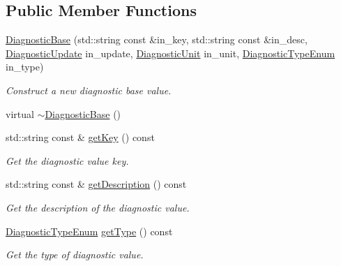 \subsection*{Public Member Functions}
\begin{DoxyCompactItemize}
\item 
\hyperlink{structvt_1_1runtime_1_1component_1_1detail_1_1_diagnostic_base_ae96f19eb79a538b5f21d6f4a6a2a5e0a}{Diagnostic\+Base} (std\+::string const \&in\+\_\+key, std\+::string const \&in\+\_\+desc, \hyperlink{namespacevt_1_1runtime_1_1component_a896637e6e183a909a17bfd8d3943c206}{Diagnostic\+Update} in\+\_\+update, \hyperlink{namespacevt_1_1runtime_1_1component_a99ec18b08862c712176126bb7d0e307a}{Diagnostic\+Unit} in\+\_\+unit, \hyperlink{namespacevt_1_1runtime_1_1component_af0bb99d9a054682217874bdc735ecac0}{Diagnostic\+Type\+Enum} in\+\_\+type)
\begin{DoxyCompactList}\small\item\em Construct a new diagnostic base value. \end{DoxyCompactList}\item 
virtual \hyperlink{structvt_1_1runtime_1_1component_1_1detail_1_1_diagnostic_base_adc580177d32483d2166bdcdb9adfd832}{$\sim$\+Diagnostic\+Base} ()
\item 
std\+::string const  \& \hyperlink{structvt_1_1runtime_1_1component_1_1detail_1_1_diagnostic_base_a5d7fb1508e6828047c4d9818a5a77668}{get\+Key} () const
\begin{DoxyCompactList}\small\item\em Get the diagnostic value key. \end{DoxyCompactList}\item 
std\+::string const  \& \hyperlink{structvt_1_1runtime_1_1component_1_1detail_1_1_diagnostic_base_a06f3c0521173ab2a2a00a0819f742dfb}{get\+Description} () const
\begin{DoxyCompactList}\small\item\em Get the description of the diagnostic value. \end{DoxyCompactList}\item 
\hyperlink{namespacevt_1_1runtime_1_1component_af0bb99d9a054682217874bdc735ecac0}{Diagnostic\+Type\+Enum} \hyperlink{structvt_1_1runtime_1_1component_1_1detail_1_1_diagnostic_base_a64cc0d8f6d2c7117514d2756750c39c5}{get\+Type} () const
\begin{DoxyCompactList}\small\item\em Get the type of diagnostic value. \end{DoxyCompactList}\item 

\end{DoxyCompactItemize}
